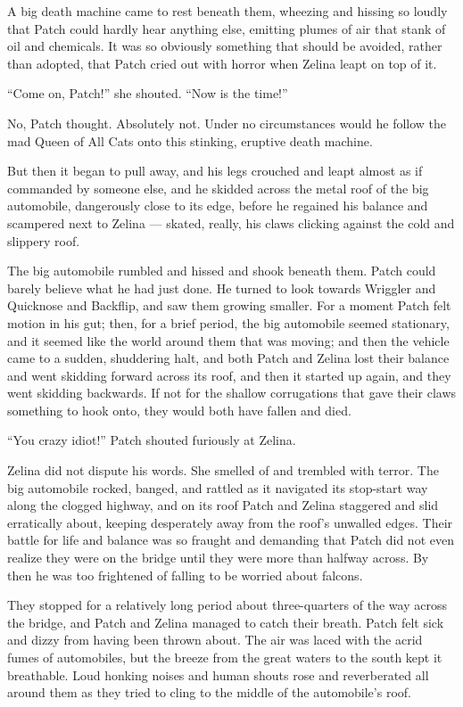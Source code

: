 \documentclass[12pt]{memoir}
\begin{document}
A big death machine came to rest beneath them, wheezing and hissing so
loudly that Patch could hardly hear anything else, emitting plumes of
air that stank of oil and chemicals. It was so obviously something
that should be avoided, rather than adopted, that Patch cried out with
horror when Zelina leapt on top of it.

“Come on, Patch!” she shouted. “Now is the time!”

No, Patch thought. Absolutely not. Under no circumstances would he
follow the mad Queen of All Cats onto this stinking, eruptive death
machine.

But then it began to pull away, and his legs crouched and leapt almost
as if commanded by someone else, and he skidded across the metal roof
of the big automobile, dangerously close to its edge, before he
regained his balance and scampered next to Zelina — skated, really,
his claws clicking against the cold and slippery roof.

The big automobile rumbled and hissed and shook beneath them. Patch
could barely believe what he had just done. He turned to look towards
Wriggler and Quicknose and Backflip, and saw them growing smaller. For
a moment Patch felt motion in his gut; then, for a brief period, the
big automobile seemed stationary, and it seemed like the world around
them that was moving; and then the vehicle came to a sudden,
shuddering halt, and both Patch and Zelina lost their balance and went
skidding forward across its roof, and then it started up again, and
they went skidding backwards. If not for the shallow corrugations that
gave their claws something to hook onto, they would both have fallen
and died.

“You crazy idiot!” Patch shouted furiously at Zelina.

Zelina did not dispute his words. She smelled of and trembled with
terror. The big automobile rocked, banged, and rattled as it navigated
its stop-start way along the clogged highway, and on its roof Patch
and Zelina staggered and slid erratically about, keeping desperately
away from the roof’s unwalled edges. Their battle for life and balance
was so fraught and demanding that Patch did not even realize they were
on the bridge until they were more than halfway across. By then he was
too frightened of falling to be worried about falcons.

They stopped for a relatively long period about three-quarters of the
way across the bridge, and Patch and Zelina managed to catch their
breath. Patch felt sick and dizzy from having been thrown about. The
air was laced with the acrid fumes of automobiles, but the breeze from
the great waters to the south kept it breathable. Loud honking noises
and human shouts rose and reverberated all around them as they tried
to cling to the middle of the automobile’s roof.
\end{document}
